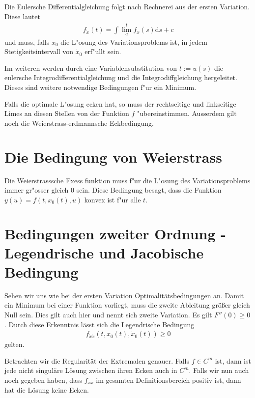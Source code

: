 \documentclass[pdftex,a4paper,oneside]{scrbook}
\begin{document}
Die Eulersche Differentialgleichung folgt nach Rechnerei aus der ersten Variation. Diese lautet
\begin{align*}
	f_{\dot{x}}(t) = \int\lim\limits_{a}^t f_x(s) \mathrm{d} s + c
\end{align*} 
und muss, falls $x_0$ die L"osung des Variationsproblems ist, in jedem Stetigkeitsintervall von $\dot{x}_0$ erf"ullt sein. 

Im weiteren werden durch eine Variablensubstitution von $t:=u(s)$ die eulersche Integrodifferentialgleichung und die Integrodiffgleichung hergeleitet. Dieses sind weitere notwendige Bedingungen f"ur ein Minimum. 

Falls die optimale L"osung ecken hat, so muss der rechtseitige und linkseitige Limes an diesen Stellen von der Funktion $f$ "ubereinstimmen. 
Ausserdem gilt noch die Weierstrass-erdmannsche Eckbedingung. 

\section{Die Bedingung von Weierstrass}

Die Weierstrasssche Exess funktion muss f"ur die L"osung des Variationsproblems immer gr"osser gleich 0 sein.
Diese Bedingung besagt, dass die Funktion $y(u) = f(t,x_0(t), u)$ konvex ist f"ur alle $t$. %

	
	\section{Bedingungen zweiter Ordnung - Legendrische und Jacobische Bedingung}
	
	Sehen wir uns wie bei der ersten Variation Optimalitätsbedingungen an. Damit ein Minimum bei einer Funktion vorliegt, muss die zweite Ableitung größer gleich Null sein. Dies gilt auch hier und nennt sich zweite Variation. Es gilt $F''(0) \ge 0$. Durch diese Erkenntnis lässt sich die Legendrische Bedingung
	\begin{align*}
	f_{\dot{x} \dot{x} }(t,x_0(t), \dot{x}_0(t )) \ge 0   
	\end{align*}
	gelten. 
	
	Betrachten wir die Regularität der Extremalen genauer. Falls $f \in C^m$ ist, dann ist jede nicht singuläre Lösung zwischen ihren Ecken auch in $C^m$. Falls wir nun auch noch gegeben haben, dass $f_{\dot{x} \dot{x}}$ im gesamten Definitionsbereich positiv ist, dann hat die Lösung keine Ecken. 
	
\end{document}

